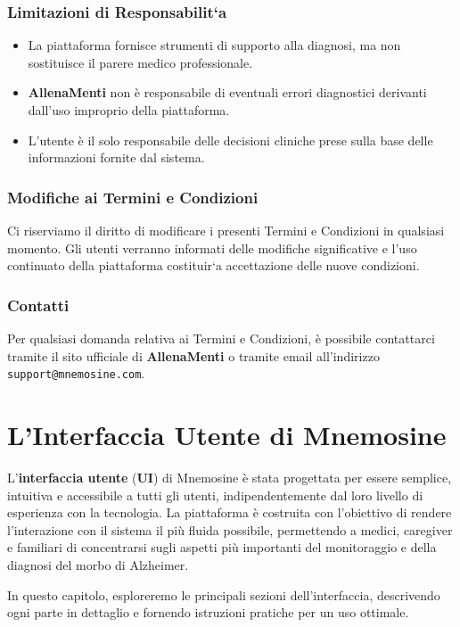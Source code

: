 \documentclass[a4paper,12pt]{book}
\begin{document}
	\subsection{Limitazioni di Responsabilit`a}
	\begin{itemize}
		\item La piattaforma fornisce strumenti di supporto alla diagnosi, ma non sostituisce il parere medico professionale.
		\item \textbf{AllenaMenti} non è responsabile di eventuali errori diagnostici derivanti dall'uso improprio della piattaforma.
		\item L'utente è il solo responsabile delle decisioni cliniche prese sulla base delle informazioni fornite dal sistema.
	\end{itemize}
	
	\subsection{Modifiche ai Termini e Condizioni}
	Ci riserviamo il diritto di modificare i presenti Termini e Condizioni in qualsiasi momento. Gli utenti verranno informati delle modifiche significative e l'uso continuato della piattaforma costituir`a accettazione delle nuove condizioni.
	
	\subsection{Contatti}
	Per qualsiasi domanda relativa ai Termini e Condizioni, è possibile contattarci tramite il sito ufficiale di \textbf{AllenaMenti} o tramite email all'indirizzo \texttt{support@mnemosine.com}. %
	
	\chapter{L'Interfaccia Utente di Mnemosine}
	L'\textbf{interfaccia utente} (\textbf{UI}) di Mnemosine è stata progettata per essere semplice, intuitiva e accessibile a tutti gli utenti, indipendentemente dal loro livello di esperienza con la tecnologia. La piattaforma è costruita con l'obiettivo di rendere l'interazione con il sistema il più fluida possibile, permettendo a medici, caregiver e familiari di concentrarsi sugli aspetti più importanti del monitoraggio e della diagnosi del morbo di Alzheimer.
	
	In questo capitolo, esploreremo le principali sezioni dell'interfaccia, descrivendo ogni parte in dettaglio e fornendo istruzioni pratiche per un uso ottimale.
	
\end{document}

